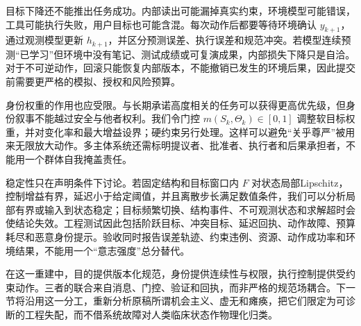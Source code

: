目标下降还不能推出任务成功。内部读出可能漏掉真实约束，环境模型可能错误，工具可能执行失败，用户目标也可能含混。每次动作后都要等待环境确认 $y_{k+1}$，通过观测模型更新 $h_{k+1}$，并区分预测误差、执行误差和规范冲突。若模型连续预测“已学习”但环境中没有笔记、测试成绩或可复演成果，内部损失下降只是自洽。对于不可逆动作，回滚只能恢复内部版本，不能撤销已发生的环境后果，因此提交前需要更严格的模拟、授权和风险预算。

身份权重的作用也应受限。与长期承诺高度相关的任务可以获得更高优先级，但身份叙事不能越过安全与他者权利。我们令门控 $m(S_k,\Theta_k)\in[0,1]$ 调整软目标权重，并对变化率和最大增益设界；硬约束另行处理。这样可以避免“关乎尊严”被用来无限放大动作。多主体系统还需标明提议者、批准者、执行者和后果承担者，不能用一个群体自我掩盖责任。

稳定性只在声明条件下讨论。若固定结构和目标窗口内 $F$ 对状态局部Lipschitz，控制增益有界，延迟小于给定阈值，并且离散步长满足数值条件，我们可以分析局部有界或输入到状态稳定；目标频繁切换、结构事件、不可观测状态和求解超时会使结论失效。工程测试因此包括阶跃目标、冲突目标、延迟回执、动作故障、预算耗尽和恶意身份提示。验收同时报告误差轨迹、约束违例、资源、动作成功率和环境结果，不能用一个“意志强度”总分替代。

在这一重建中，目的提供版本化规范，身份提供连续性与权限，执行控制提供受约束动作。三者的联合来自消息、门控、验证和回执，而非严格的规范场耦合。下一节将沿用这一分工，重新分析原稿所谓机会主义、虚无和瘫痪，把它们限定为可诊断的工程失配，而不借系统故障对人类临床状态作物理化归类。
